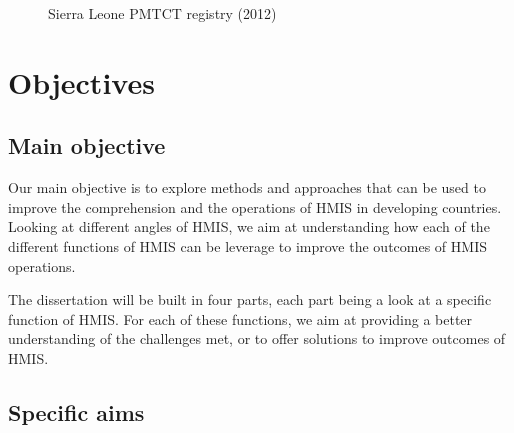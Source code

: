\documentclass[a4paper,11pt,final,twoside]{article}
\begin{document}
\begin{figure}[ht]
\begin{center}
\caption{Sierra Leone PMTCT registry (2012)}
\end{center}
\end{figure}

\section{Objectives}

	\subsection{Main objective}

Our main objective is to explore methods and approaches that can be used to improve the comprehension and the operations of HMIS in developing countries. Looking at different angles of HMIS, we aim at understanding how each of the different functions of HMIS can be leverage to improve the outcomes of HMIS operations.

The dissertation will be built in four parts, each part being a look at a specific function of HMIS. For each of these functions, we aim at providing a better understanding of the challenges met, or to offer solutions to improve outcomes of HMIS.

	\subsection{Specific aims}
\end{document}

